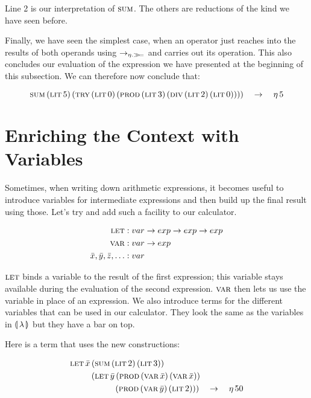 Line 2 is our interpretation of $\textsc{sum}$. The others are reductions of the
kind we have seen before.

Finally, we have seen the simplest case, when an operator just reaches into
the results of both operands using $\to_{\eta.\mathbin{\gg\!=}}$ and carries out its
operation. This also concludes our evaluation of the expression we have
presented at the beginning of this subsection. We can therefore now
conclude that:

$$
\textsc{sum}\,(\textsc{lit}\,5)\,(\textsc{try}\,(\textsc{lit}\,0)\,(\textsc{prod}\,(\textsc{lit}\,3)\,(\textsc{div}\,(\textsc{lit}\,2)\,(\textsc{lit}\,0))))
\quad \to \quad \eta\,5
$$


\section{Enriching the Context with Variables}
\label{sec:enriching-the-context-with-variables}

Sometimes, when writing down arithmetic expressions, it becomes useful to
introduce variables for intermediate expressions and then build up the
final result using those. Let's try and add such a facility to our
calculator.

\begin{align*}
  \textsc{let} &: var \to exp \to exp \to exp \\
  \textsc{var} &: var \to exp \\
  \bar{x}, \bar{y}, \bar{z},\ldots &: var
\end{align*}

$\textsc{let}$ binds a variable to the result of the first expression; this
variable stays available during the evaluation of the second
expression. $\textsc{var}$ then lets us use the variable in place of an
expression. We also introduce terms for the different variables that can be
used in our calculator. They look the same as the variables in ${\llparenthesis \, \lambda \, \rrparenthesis}$ 
but they have a bar on top.

Here is a term that uses the new constructions:

\begin{align*}
& \letecn{x}{\sumec{\litec{2}}{\litec{3}}}
 {\\ & \hspace{9mm} \letec{y}{\prodec{\varec{x}}{\varec{x}}}
 {\\ & \hspace{19mm} \prodec{\varec{y}}{\litec{2}}}} \quad \to \quad \ap{\eta}{50}
\end{align*}

